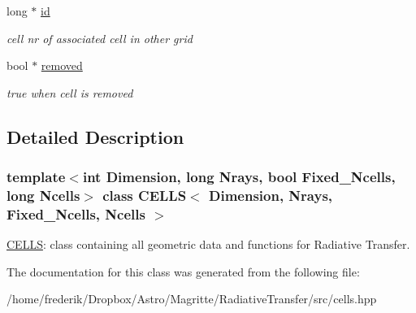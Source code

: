 \begin{DoxyCompactItemize}
long $\ast$ \mbox{\hyperlink{classCELLS_acb12cba62ad26f427e31ded46e31255a}{id}}
\begin{DoxyCompactList}\small\item\em cell nr of associated cell in other grid \end{DoxyCompactList}\item 
\mbox{\label{classCELLS_a422584a3fa93f4f29194099cb274d7aa}} 
bool $\ast$ \mbox{\hyperlink{classCELLS_a422584a3fa93f4f29194099cb274d7aa}{removed}}
\begin{DoxyCompactList}\small\item\em true when cell is removed \end{DoxyCompactList}\end{DoxyCompactItemize}


\subsection{Detailed Description}
\subsubsection*{template$<$int Dimension, long Nrays, bool Fixed\+\_\+\+Ncells, long Ncells$>$\newline
class C\+E\+L\+L\+S$<$ Dimension, Nrays, Fixed\+\_\+\+Ncells, Ncells $>$}

\mbox{\hyperlink{classCELLS}{C\+E\+L\+LS}}\+: class containing all geometric data and functions for Radiative Transfer. 

The documentation for this class was generated from the following file\+:\begin{DoxyCompactItemize}
\item 
/home/frederik/\+Dropbox/\+Astro/\+Magritte/\+Radiative\+Transfer/src/cells.\+hpp\end{DoxyCompactItemize}
